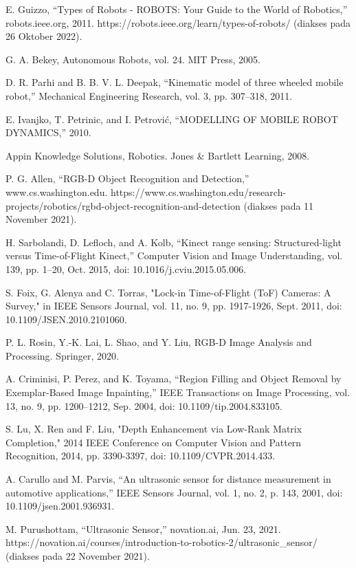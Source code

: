 E. Guizzo, “Types of Robots - ROBOTS: Your Guide to the World of Robotics,” robots.ieee.org, 2011. https://robots.ieee.org/learn/types-of-robots/ (diakses pada 26 Oktober 2022).

G. A. Bekey, Autonomous Robots, vol. 24. MIT Press, 2005.

D. R. Parhi and B. B. V. L. Deepak, “Kinematic model of three wheeled mobile robot,” Mechanical Engineering Research, vol. 3, pp. 307–318, 2011.

E. Ivanjko, T. Petrinic, and I. Petrović, “MODELLING OF MOBILE ROBOT DYNAMICS,” 2010.

Appin Knowledge Solutions, Robotics. Jones \& Bartlett Learning, 2008.

P. G. Allen, “RGB-D Object Recognition and Detection,” www.cs.washington.edu. https://www.cs.washington.edu/research-projects/robotics/rgbd-object-recognition-and-detection (diakses pada 11 November 2021).

H. Sarbolandi, D. Lefloch, and A. Kolb, “Kinect range sensing: Structured-light versus Time-of-Flight Kinect,” Computer Vision and Image Understanding, vol. 139, pp. 1–20, Oct. 2015, doi: 10.1016/j.cviu.2015.05.006.

S. Foix, G. Alenya and C. Torras, "Lock-in Time-of-Flight (ToF) Cameras: A Survey," in IEEE Sensors Journal, vol. 11, no. 9, pp. 1917-1926, Sept. 2011, doi: 10.1109/JSEN.2010.2101060.

P. L. Rosin, Y.-K. Lai, L. Shao, and Y. Liu, RGB-D Image Analysis and Processing. Springer, 2020.

A. Criminisi, P. Perez, and K. Toyama, “Region Filling and Object Removal by Exemplar-Based Image Inpainting,” IEEE Transactions on Image Processing, vol. 13, no. 9, pp. 1200–1212, Sep. 2004, doi: 10.1109/tip.2004.833105.

S. Lu, X. Ren and F. Liu, "Depth Enhancement via Low-Rank Matrix Completion," 2014 IEEE Conference on Computer Vision and Pattern Recognition, 2014, pp. 3390-3397, doi: 10.1109/CVPR.2014.433.

A. Carullo and M. Parvis, “An ultrasonic sensor for distance measurement in automotive applications,” IEEE Sensors Journal, vol. 1, no. 2, p. 143, 2001, doi: 10.1109/jsen.2001.936931.

M. Purushottam, “Ultrasonic Sensor,” novation.ai, Jun. 23, 2021. https://novation.ai/courses/introduction-to-robotics-2/ultrasonic\_sensor/ (diakses pada 22 November 2021).

